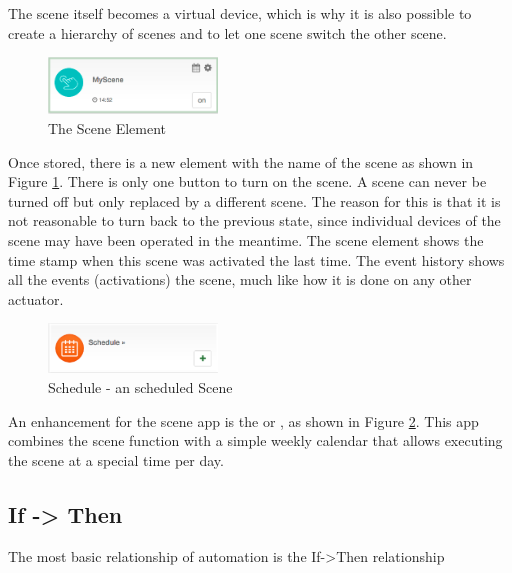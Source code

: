 The scene itself becomes a virtual device, which is why it is also possible to create 
a hierarchy of scenes and to let one scene switch the other scene.

\begin{figure}
\begin{center}
\includegraphics[width=0.4\textwidth]{pngs/cap6/app8.png}
\caption{The Scene Element}
\label{app8}
\end{center}
\end{figure}

Once stored, there is a new element with the name of the scene as shown in Figure \ref{app8}. 
There is only one button to turn on the scene. A scene can never be turned off but only 
replaced by a different scene. The reason for this is that it is not reasonable to turn 
back to the previous state, since individual devices of the scene may have been operated 
in the meantime. The scene element shows the time stamp when this scene was activated 
the last time. The event history shows all the events (activations) the scene, much 
like how it is done on any other \zway actuator.

\begin{figure}
\begin{center}
\includegraphics[width=0.4\textwidth]{pngs/cap6/app9.png}
\caption{Schedule - an scheduled Scene}
\label{app9}
\end{center}
\end{figure}

An enhancement for the scene app is the  or , as shown in 
Figure \ref{app9}. This app combines the scene function with a simple weekly calendar that 
allows executing the scene at a special time per day.


\subsection{If -> Then}
\label{cap:ifthen}

The most basic relationship of automation is the If->Then relationship

